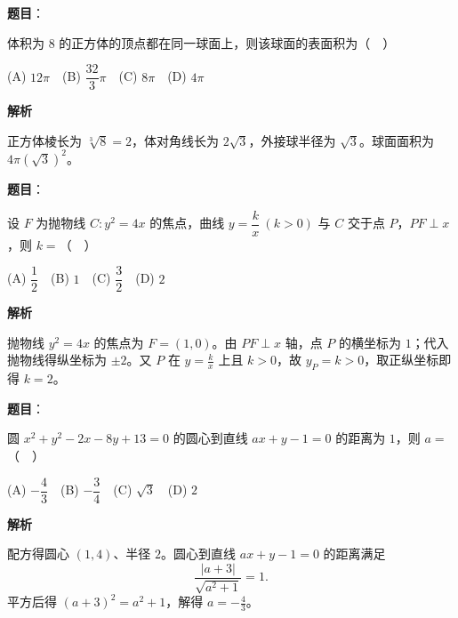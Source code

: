 \begin{answer}

\textbf{题目}：

体积为 $8$ 的正方体的顶点都在同一球面上，则该球面的表面积为（　）

   (A) $12\pi$　(B) $\dfrac{32}{3}\pi$　(C) $8\pi$　(D) $4\pi$

\textbf{解析}

正方体棱长为 $\sqrt[3]{8}=2$，体对角线长为 $2\sqrt3$，外接球半径为 $\sqrt3$。球面面积为 $4\pi(\sqrt3)^2$。


\end{answer}
\begin{answer}

\textbf{题目}：

设 $F$ 为抛物线 $C:y^2=4x$ 的焦点，曲线 $y=\dfrac{k}{x}\ (k>0)$ 与 $C$ 交于点 $P$，$PF\perp x$，则 $k=$（　）

   (A) $\dfrac12$　(B) $1$　(C) $\dfrac32$　(D) $2$

\textbf{解析}

抛物线 $y^2=4x$ 的焦点为 $F=(1,0)$。由 $PF\perp x$ 轴，点 $P$ 的横坐标为 $1$；代入抛物线得纵坐标为 $\pm2$。又 $P$ 在 $y=\frac{k}{x}$ 上且 $k>0$，故 $y_P=k>0$，取正纵坐标即得 $k=2$。


\end{answer}
\begin{answer}

\textbf{题目}：

圆 $x^2+y^2-2x-8y+13=0$ 的圆心到直线 $ax+y-1=0$ 的距离为 $1$，则 $a=$（　）

   (A) $-\dfrac43$　(B) $-\dfrac34$　(C) $\sqrt3$　(D) $2$

\textbf{解析}

配方得圆心 $(1,4)$、半径 $2$。圆心到直线 $ax+y-1=0$ 的距离满足
\nopagebreak[4]
\[
\frac{|a+3|}{\sqrt{a^2+1}}=1.
\]
平方后得 $(a+3)^2=a^2+1$，解得 $a=-\frac43$。


\end{answer}
